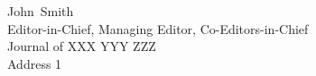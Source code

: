\documentclass{cover-letter}
\def\EditorFirstName{John}
\def\EditorLastName{Smith}
\def\EditorName{\EditorFirstName~\EditorLastName}
\def\EditorTitle{Editor-in-Chief, Managing Editor, Co-Editors-in-Chief}
\def\JournalName{Journal of XXX YYY ZZZ} %
\def\JournalAddress{Address 1} %
\begin{document}
\begin{letter}{\EditorName \\ \EditorTitle \\ \JournalName \\ \JournalAddress}








\end{letter}
\end{document}
